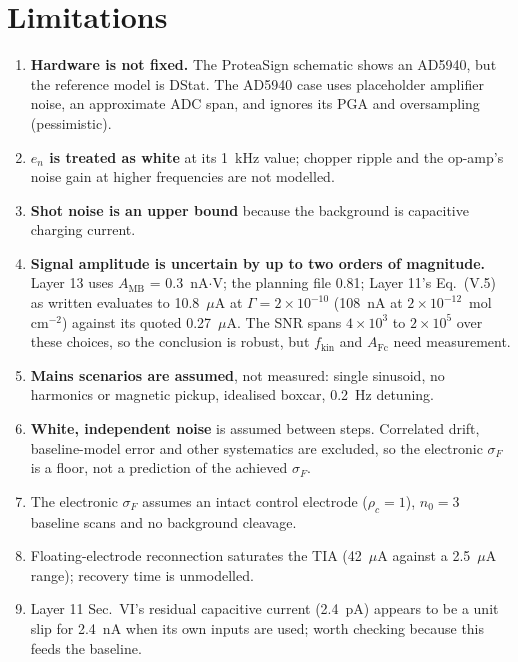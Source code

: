 \documentclass[10pt]{article}
\numberwithin{equation}{section}
\begin{document}
\section{Limitations}
\begin{enumerate}[leftmargin=1.5em,itemsep=1pt,topsep=0pt]
\item \textbf{Hardware is not fixed.} The ProteaSign schematic shows an AD5940, but the reference model is DStat. The AD5940 case uses placeholder amplifier noise, an approximate ADC span, and ignores its PGA and oversampling (pessimistic).
\item \textbf{$e_n$ is treated as white} at its 1~kHz value; chopper ripple and the op-amp's noise gain at higher frequencies are not modelled.
\item \textbf{Shot noise is an upper bound} because the background is capacitive charging current.
\item \textbf{Signal amplitude is uncertain by up to two orders of magnitude.} Layer 13 uses $A_{\text{MB}}$ = 0.3~nA$\cdot$V; the planning file 0.81; Layer 11's Eq.~(V.5) as written evaluates to 10.8~$\mu$A at $\Gamma = 2\times10^{-10}$ (108~nA at $2\times10^{-12}$~mol\,cm$^{-2}$) against its quoted 0.27~$\mu$A.
The SNR spans $4\times10^3$ to $2\times10^5$ over these choices, so the conclusion is robust, but $f_{\text{kin}}$ and $A_{\text{Fc}}$ need measurement.
\item \textbf{Mains scenarios are assumed}, not measured: single sinusoid, no harmonics or magnetic pickup, idealised boxcar, 0.2~Hz detuning.
\item \textbf{White, independent noise} is assumed between steps. Correlated drift, baseline-model error and other systematics are excluded, so the electronic $\sigma_F$ is a floor, not a prediction of the achieved $\sigma_F$.
\item The electronic $\sigma_F$ assumes an intact control electrode ($\rho_c = 1$), $n_0 = 3$ baseline scans and no background cleavage.
\item Floating-electrode reconnection saturates the TIA (42~$\mu$A against a 2.5~$\mu$A range); recovery time is unmodelled.
\item Layer 11 Sec.~VI's residual capacitive current (2.4~pA) appears to be a unit slip for 2.4~nA when its own inputs are used; worth checking because this feeds the baseline.
\end{enumerate}
\end{document}
